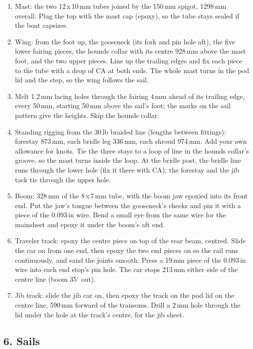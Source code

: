 \documentclass[11pt]{article}
\newcommand{\step}[1]{\subsection*{#1}}
\begin{document}
\begin{enumerate}
\item Mast: the two 12\,x\,10\,mm tubes joined by the 150\,mm spigot, 1298\,mm overall. Plug the top with the mast cap (epoxy), so the tube stays sealed if the boat capsizes.
\item Wing: from the foot up, the gooseneck (its fork and pin hole aft), the five lower fairing pieces, the hounds collar with its centre 928\,mm above the mast foot, and the two upper pieces. Line up the trailing edges and fix each piece to the tube with a drop of CA at both ends. The whole mast turns in the pod lid and the step, so the wing follows the sail.
\item Melt 1.2\,mm lacing holes through the fairing 4\,mm ahead of its trailing edge, every 50\,mm, starting 50\,mm above the sail's foot; the marks on the sail pattern give the heights. Skip the hounds collar.
\item Standing rigging from the 30\,lb braided line (lengths between fittings): forestay 873\,mm, each bridle leg 336\,mm, each shroud 974\,mm. Add your own allowance for knots. Tie the three stays to a loop of line in the hounds collar's groove, so the mast turns inside the loop. At the bridle post, the bridle line runs through the lower hole (fix it there with CA); the forestay and the jib tack tie through the upper hole.
\item Boom: 328\,mm of the 8\,x\,7\,mm tube, with the boom jaw epoxied into its front end. Put the jaw's tongue between the gooseneck's cheeks and pin it with a piece of the 0.093\,in wire. Bend a small eye from the same wire for the mainsheet and epoxy it under the boom's aft end.
\item Traveler track: epoxy the centre piece on top of the rear beam, centred. Slide the car on from one end, then epoxy the two end pieces on so the rail runs continuously, and sand the joints smooth. Press a 19\,mm piece of the 0.093\,in wire into each end stop's pin hole. The car stops 213\,mm either side of the centre line (boom 35$^\circ$ out).
\item Jib track: slide the jib car on, then epoxy the track on the pod lid on the centre line, 590\,mm forward of the transoms. Drill a 2\,mm hole through the lid under the hole at the track's centre, for the jib sheet.
\end{enumerate}
\step{6. Sails}
\end{document}

